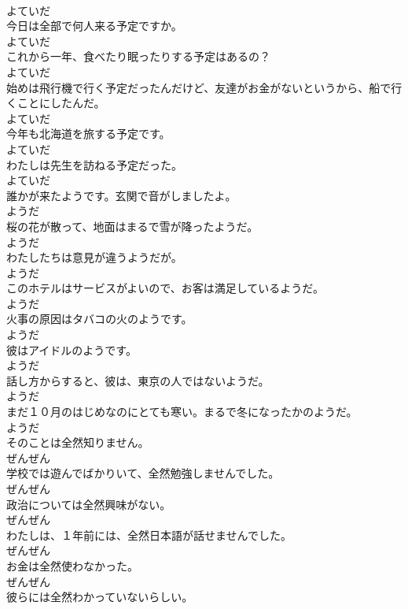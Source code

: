 \documentclass[8pt]{extreport}
\begin{document}
\begin{CJK}{UTF8}{min}
\\	よていだ	
\\	今日は全部で何人来る予定ですか。	
\\	よていだ	
\\	これから一年、食べたり眠ったりする予定はあるの？	
\\	よていだ	
\\	始めは飛行機で行く予定だったんだけど、友達がお金がないというから、船で行くことにしたんだ。	
\\	よていだ	
\\	今年も北海道を旅する予定です。	
\\	よていだ	
\\	わたしは先生を訪ねる予定だった。	
\\	よていだ	
\\	誰かが来たようです。玄関で音がしましたよ。	
\\	ようだ	
\\	桜の花が散って、地面はまるで雪が降ったようだ。	
\\	ようだ	
\\	わたしたちは意見が違うようだが。	
\\	ようだ	
\\	このホテルはサービスがよいので、お客は満足しているようだ。	
\\	ようだ	
\\	火事の原因はタバコの火のようです。	
\\	ようだ	
\\	彼はアイドルのようです。	
\\	ようだ	
\\	話し方からすると、彼は、東京の人ではないようだ。	
\\	ようだ	
\\	まだ１０月のはじめなのにとても寒い。まるで冬になったかのようだ。	
\\	ようだ	
\\	そのことは全然知りません。	
\\	ぜんぜん	
\\	学校では遊んでばかりいて、全然勉強しませんでした。	
\\	ぜんぜん	
\\	政治については全然興味がない。	
\\	ぜんぜん	
\\	わたしは、１年前には、全然日本語が話せませんでした。	
\\	ぜんぜん	
\\	お金は全然使わなかった。	
\\	ぜんぜん	
\\	彼らには全然わかっていないらしい。	

\end{CJK}
\end{document}
